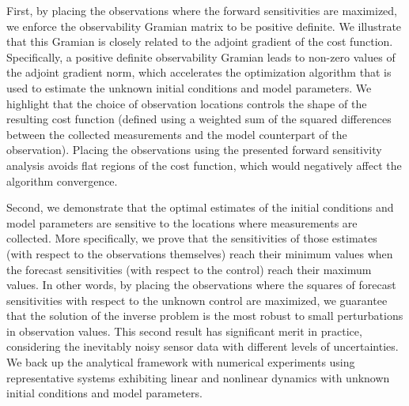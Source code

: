 \documentclass{article}
\begin{document}
First, by placing the observations where the forward sensitivities are maximized, we enforce the observability Gramian matrix to be positive definite. We illustrate that this Gramian is closely related to the adjoint gradient of the cost function. Specifically, a positive definite observability Gramian leads to non-zero values of the adjoint gradient norm, which accelerates the optimization algorithm that is used to estimate the unknown initial conditions and model parameters. We highlight that the choice of observation locations controls the shape of the resulting cost function (defined using a weighted sum of the squared differences between the collected measurements and the model counterpart of the observation). Placing the observations using the presented forward sensitivity analysis avoids flat regions of the cost function, which would negatively affect the algorithm convergence.

\textcolor{rev2}{Second, we demonstrate that the optimal estimates of the initial conditions and model parameters are sensitive to the locations where measurements are collected. More specifically, we prove that the sensitivities of those estimates (with respect to the observations themselves) reach their minimum values when the forecast sensitivities (with respect to the control) reach their maximum values.} In other words, by placing the observations where the squares of forecast sensitivities with respect to the unknown control are maximized, we guarantee that the solution of the inverse problem is the most robust to small perturbations in observation values. This second result has significant merit in practice, considering the inevitably noisy sensor data with different levels of uncertainties. We back up the analytical framework with numerical experiments using representative systems exhibiting linear and nonlinear dynamics with unknown initial conditions and model parameters.


\end{document}
